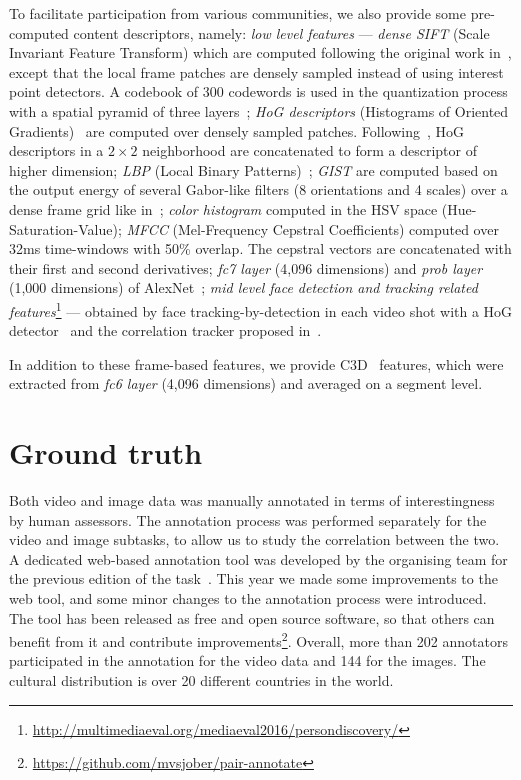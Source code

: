 \documentclass[sigconf]{acmart-me}
\begin{document}
To facilitate participation from various communities, we also
provide some pre-computed content descriptors, namely: \emph{low
level features} --- \emph{dense SIFT} (Scale Invariant Feature
Transform) which are computed following the original work
in~\cite{Lowe2004}, except that the local frame patches are densely
sampled instead of using interest point detectors. A codebook of 300
codewords is used in the quantization process with a spatial pyramid
of three layers~\cite{Lazebnik2006}; \emph{HoG descriptors}
(Histograms of Oriented Gradients)~\cite{Dalal2005} are computed
over densely sampled patches. Following~\cite{Xiao2010}, HoG
descriptors in a $2\times2$ neighborhood are concatenated to form a
descriptor of higher dimension; \emph{LBP} (Local Binary
Patterns)~\cite{Ojala2002}; \emph{GIST} are computed based on the
output energy of several Gabor-like filters (8 orientations and 4
scales) over a dense frame grid like in~\cite{Oliva2001};
\emph{color histogram} computed in the HSV space
(Hue-Saturation-Value); \emph{MFCC} (Mel-Frequency Cepstral
Coefficients) computed over 32ms time-windows with 50\%
overlap. The cepstral vectors are concatenated with their first and
second derivatives; \emph{fc7 layer} (4,096 dimensions) and
\emph{prob layer} (1,000 dimensions) of AlexNet~\cite{Jiang2015};
\emph{mid level face detection and tracking related
features}\footnote{\url{http://multimediaeval.org/mediaeval2016/persondiscovery/}}
--- obtained by face tracking-by-detection in each video shot with a
HoG detector~\cite{Dalal2005} and the correlation tracker proposed
in~\cite{Danelljan2014}.

In addition to these frame-based features, we provide C3D~\cite{tran2015learning} features, which were extracted from \emph{fc6 layer} (4,096 dimensions) and averaged on a segment level.



\section{Ground truth}

Both video and image data was manually annotated in terms of interestingness by human assessors.
The annotation process was performed separately for the video and image subtasks, to allow us to study the correlation between the two.
A dedicated web-based annotation tool was developed by the organising team for the previous edition of the task~\cite{demarty2016mediaeval}.
This year we made some improvements to the web tool, and some minor changes to the annotation process were introduced.
The tool has been released as free and open source software, so that others can benefit from it and contribute
improvements\footnote{\url{https://github.com/mvsjober/pair-annotate}}.
Overall, more than 202 annotators participated in the annotation for the video data and 144 for the images.
The cultural distribution is over 20 different countries in the world.
\end{document}
